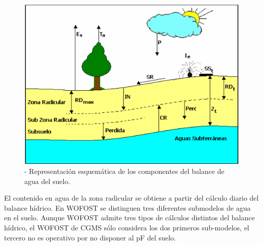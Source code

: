 \begin{figure}[!h]
	\centering
	\includegraphics[scale=0.8]{Images/representacion_esquematica_de_los_componentes_del_balance_del_agua_suelo.png}
	\caption{- Representación esquemática de los componentes del balance de agua del suelo. \parencite{sebem2005aportaciones}}
	\label{fig:img_4}
\end{figure}

El contenido en agua de la zona radicular se obtiene a partir del cálculo diario del balance hídrico. En WOFOST se distinguen tres diferentes submodelos de agua en el suelo. Aunque WOFOST admite tres tipos de cálculos distintos del balance hídrico, el WOFOST de CGMS sólo considera los dos primeros sub-modelos, el tercero no es operativo por no disponer al pF del suelo.